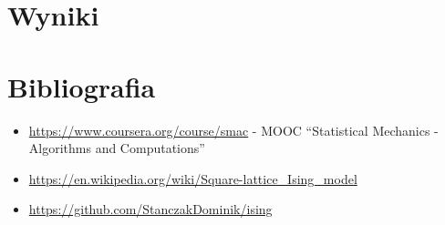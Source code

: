 \documentclass[11pt]{article}
\begin{document}
\section{Wyniki}

\section{Bibliografia}
  \begin{itemize}
      \item \url{https://www.coursera.org/course/smac} - MOOC ``Statistical Mechanics -
      Algorithms and Computations''
      \item \url{https://en.wikipedia.org/wiki/Square-lattice_Ising_model}
      \item \url{https://github.com/StanczakDominik/ising}
  \end{itemize}
\end{document}
